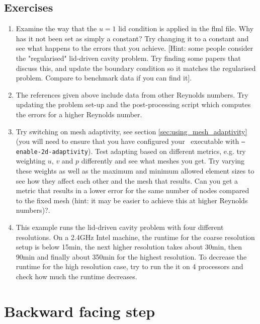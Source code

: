 \subsection{Exercises}
\begin{enumerate}
\item Examine the way that the $u=1$ lid condition is applied in the flml file. Why has it not been set as simply a constant?
Try changing it to a constant and see what happens to the errors that you achieve. [Hint: some people consider the "regularised" 
lid-driven cavity problem. Try finding some papers that discuss this, and update the boundary condition so it matches the 
regularised problem. Compare to benchmark data if you can find it].
\item The references given above include data from other Reynolds numbers. Try updating the problem set-up and the post-processing script which computes
the errors for a higher Reynolds number.
\item Try switching on mesh adaptivity, see section \ref{sec:using_mesh_adaptivity} (you will need to ensure that you have configured your \fluidity\ executable with \texttt{--enable-2d-adaptivity}). 
Test adapting based on different metrics, e.g. try weighting $u$, $v$ and $p$
differently and see what meshes you get. Try varying these weights as well as the maximum and minimum allowed element
sizes to see how they affect each other and the mesh that results. Can you get a metric that results in a lower
error for the same number of nodes compared to the fixed mesh (hint: it may be easier to achieve this at higher Reynolds numbers)?.
\item This example runs the lid-driven cavity problem with four different resolutions. On a 2.4GHz Intel machine, the runtime for the coarse resolution setup is below 15min, the next higher resolution takes about 30min, then 90min and finally about 350min for the highest resolution. To decrease the runtime for the high resolution case, try to run the it on 4 processors and check how much the runtime decreases.
\end{enumerate}



\section{Backward facing step}
\label{sect:backward_facing_step}


